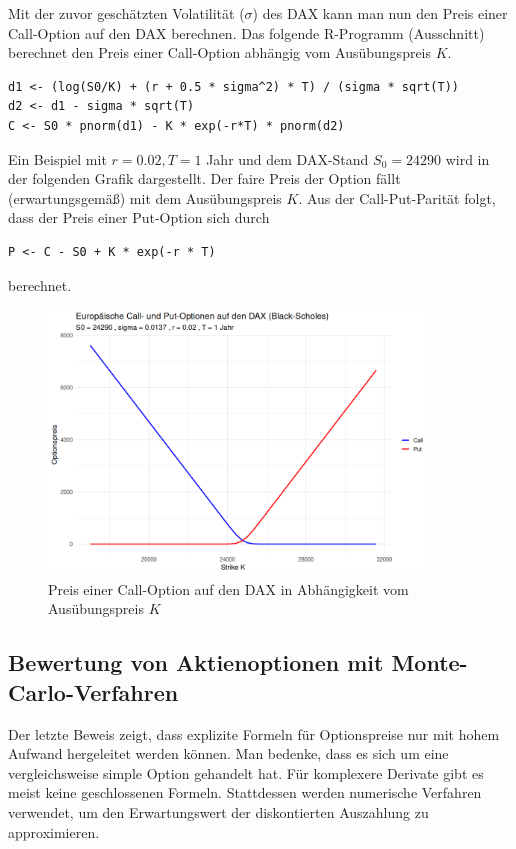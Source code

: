 \begin{bsp}
Mit der zuvor geschätzten Volatilität ($\sigma$) des DAX kann
man nun den Preis einer Call-Option auf den DAX berechnen. Das folgende
R-Programm (Ausschnitt) berechnet den Preis einer Call-Option abhängig
vom Ausübungspreis $K$.

\begin{lstlisting}
d1 <- (log(S0/K) + (r + 0.5 * sigma^2) * T) / (sigma * sqrt(T))
d2 <- d1 - sigma * sqrt(T)
C <- S0 * pnorm(d1) - K * exp(-r*T) * pnorm(d2)
\end{lstlisting}
Ein Beispiel mit $r = 0.02, T = 1$ Jahr und dem DAX-Stand $S_0 = 24290$ wird in
der folgenden Grafik dargestellt. Der faire Preis der Option
fällt (erwartungsgemäß) mit dem Ausübungspreis $K$.
Aus der Call-Put-Parität folgt, dass der Preis einer Put-Option
sich durch

\begin{lstlisting}
P <- C - S0 + K * exp(-r * T)
\end{lstlisting}
berechnet.

\begin{figure}[H]
    \centering
    \includegraphics[width=0.9\textwidth]{images/dax_bs.png}
    \caption{Preis einer Call-Option auf den DAX in Abhängigkeit vom Ausübungspreis $K$}
    \label{fig:dax_bs}
\end{figure}

\end{bsp}

\subsection{Bewertung von Aktienoptionen mit Monte-Carlo-Verfahren}
Der letzte Beweis zeigt, dass explizite Formeln für Optionspreise nur mit hohem
Aufwand hergeleitet werden können. Man bedenke, dass es sich um eine 
vergleichsweise simple Option gehandelt hat. Für komplexere Derivate
gibt es meist keine geschlossenen Formeln. Stattdessen werden numerische Verfahren
verwendet, um den Erwartungswert der diskontierten Auszahlung zu approximieren.


